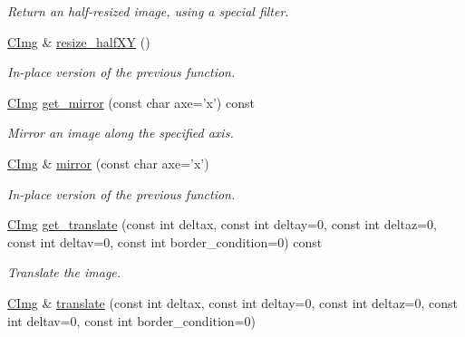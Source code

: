 \begin{DoxyCompactItemize}
\begin{DoxyCompactList}\small\item\em Return an half-\/resized image, using a special filter. \end{DoxyCompactList}\item 
\hypertarget{structcimg__library_1_1_c_img_a593ac7955800c9964972eac146835227}{\hyperlink{structcimg__library_1_1_c_img}{C\-Img} \& \hyperlink{structcimg__library_1_1_c_img_a593ac7955800c9964972eac146835227}{resize\-\_\-half\-X\-Y} ()}\label{structcimg__library_1_1_c_img_a593ac7955800c9964972eac146835227}

\begin{DoxyCompactList}\small\item\em In-\/place version of the previous function. \end{DoxyCompactList}\item 
\hypertarget{structcimg__library_1_1_c_img_aa30247a4338d50b394c47b3a7eeeab48}{\hyperlink{structcimg__library_1_1_c_img}{C\-Img} \hyperlink{structcimg__library_1_1_c_img_aa30247a4338d50b394c47b3a7eeeab48}{get\-\_\-mirror} (const char axe='x') const }\label{structcimg__library_1_1_c_img_aa30247a4338d50b394c47b3a7eeeab48}

\begin{DoxyCompactList}\small\item\em Mirror an image along the specified axis. \end{DoxyCompactList}\item 
\hypertarget{structcimg__library_1_1_c_img_a0dddf2bd640a2b4c8a1218bf73f116bb}{\hyperlink{structcimg__library_1_1_c_img}{C\-Img} \& \hyperlink{structcimg__library_1_1_c_img_a0dddf2bd640a2b4c8a1218bf73f116bb}{mirror} (const char axe='x')}\label{structcimg__library_1_1_c_img_a0dddf2bd640a2b4c8a1218bf73f116bb}

\begin{DoxyCompactList}\small\item\em In-\/place version of the previous function. \end{DoxyCompactList}\item 
\hyperlink{structcimg__library_1_1_c_img}{C\-Img} \hyperlink{structcimg__library_1_1_c_img_af8c9f6ca06e378ada0bfd7516ae4b69d}{get\-\_\-translate} (const int deltax, const int deltay=0, const int deltaz=0, const int deltav=0, const int border\-\_\-condition=0) const 
\begin{DoxyCompactList}\small\item\em Translate the image. \end{DoxyCompactList}\item 
\hypertarget{structcimg__library_1_1_c_img_acc1fc108afa5fcd0f334ba0c854a5481}{\hyperlink{structcimg__library_1_1_c_img}{C\-Img} \& \hyperlink{structcimg__library_1_1_c_img_acc1fc108afa5fcd0f334ba0c854a5481}{translate} (const int deltax, const int deltay=0, const int deltaz=0, const int deltav=0, const int border\-\_\-condition=0)}\label{structcimg__library_1_1_c_img_acc1fc108afa5fcd0f334ba0c854a5481}


\end{DoxyCompactItemize}
